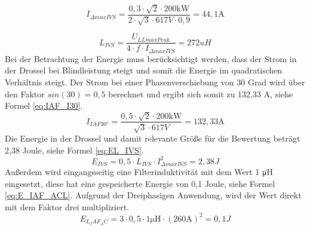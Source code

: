		\begin{equation}
		\label{eq:DeltaIIVS}
		I_{\Delta max IVS}= \dfrac{0,3\cdot \sqrt{2} \cdot 200 \si{\kilo \watt}}{2 \cdot \sqrt{3} \cdot 617 \si{V} \cdot 0,9} = 44,1 \si{\A}
		\end{equation}
		
		\begin{equation}
			\label{eq:Livs}
			L_{IVS}= \dfrac{U_{LLmaxPeak}}{4\cdot f \cdot I_{\Delta max IVS}} = 272 uH
		\end{equation}
		Bei der Betrachtung der Energie muss berücksichtigt werden, dass der Strom in der Drossel bei Blindleistung steigt und somit die Energie im quadratischen Verhältnis steigt. Der Strom bei einer Phasenverschiebung von 30 Grad wird über den Faktor $sin(30)=0,5$ berechnet und ergibt sich somit zu 132,33 A, siehe Formel \ref{eq:IAF_I30}.
		\begin{equation}
			\label{eq:IAF_I30}
			I_{IAF30°}=\dfrac{0,5\cdot \sqrt{2} \cdot 200 \si{\kilo \watt}} { \sqrt{3} \cdot 617 \si{V}} = 132,33 \si{\A}
		\end{equation}
		 Die Energie in der Drossel und damit relevante Größe für die Bewertung beträgt 2,38 Joule, siehe Formel \ref{eq:EL_IVS}.
		\begin{equation}
			\label{eq:EL_IVS}
			E_{IVS}=0,5 \cdot L_{IVS} \cdot I_{\Delta max IVS}^{2} = 2,38 J
		\end{equation}
		Außerdem wird eingangsseitig eine Filterinduktivität mit dem Wert 1 \si{\micro \henry} eingesetzt, diese hat eine gespeicherte Energie von 0,1 Joule, siehe Formel \ref{eq:E_IAF_ACL}. Aufgrund der Dreiphasigen Anwendung, wird der Wert direkt mit dem Faktor drei multipliziert.
			\begin{equation}
			\label{eq:E_IAF_ACL}
			E_{L_IAF_AC}=3\cdot 0,5 \cdot 1 \si{\micro \henry} \cdot (260 \si{\ampere})^{2} = 0,1 J
		\end{equation}
	
